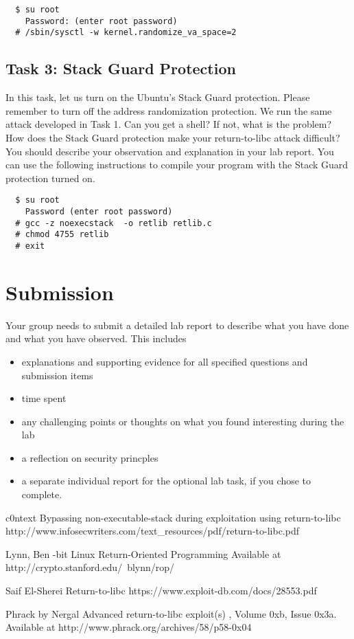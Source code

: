 \begin{verbatim}
  $ su root
    Password: (enter root password)
  # /sbin/sysctl -w kernel.randomize_va_space=2
\end{verbatim}



\subsection{Task 3: Stack Guard Protection}

In this task, let us turn on the Ubuntu's Stack Guard protection.  
Please remember to turn off the address randomization protection. 
We run the same attack developed in Task 1. Can you get a shell? If not, 
what is the problem? How does the Stack Guard protection
make your return-to-libc attack difficult?
You should describe your observation and explanation
in your lab report. You can use the following instructions to compile
your program with the Stack Guard protection turned on.

\begin{verbatim}
  $ su root 
    Password (enter root password)
  # gcc -z noexecstack  -o retlib retlib.c
  # chmod 4755 retlib
  # exit  
\end{verbatim}

\section{Submission}
Your group needs to submit a detailed lab report to describe what you have
done and what you have observed. This includes 
\begin{itemize}
\item explanations and supporting evidence for all specified questions and submission items
\item time spent
\item any challenging points or thoughts on what you found interesting during the lab 
\item a reflection on security princples
\item a separate individual report for the optional lab task, if you chose to complete.
\end{itemize}
 



\begin{thebibliography}{10}

c0ntext
\newblock Bypassing non-executable-stack during exploitation using return-to-libc
\newblock http://www.infosecwriters.com/text\_resources/pdf/return-to-libc.pdf 

Lynn, Ben -bit Linux Return-Oriented Programming
\newblock  Available at http://crypto.stanford.edu/~blynn/rop/

Saif El-Sherei
\newblock Return-to-libc
\newbloc https://www.exploit-db.com/docs/28553.pdf	

Phrack by Nergal
\newblock Advanced return-to-libc exploit(s) 
, Volume 0xb, Issue 0x3a. Available at http://www.phrack.org/archives/58/p58-0x04				
				
\end{thebibliography}


